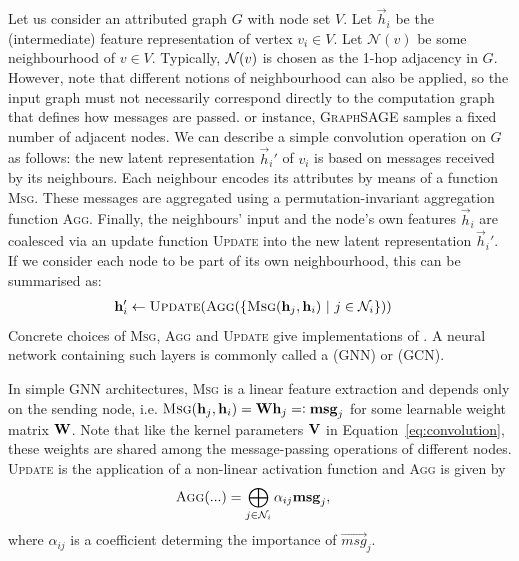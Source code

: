 \documentclass[
	fontsize=10pt, %
	twoside=false, %
	secnumdepth=1, %
  toc=indentunnumbered %
]{kaobook}
\begin{document}
Let us consider an attributed graph
$G$ with node set $V$.
Let $\vec h_i$ be the (intermediate) feature representation of vertex $v_i \in
V$. Let $\mathcal{N}(v)$ be some neighbourhood of $v \in V$. Typically,
$\neighb(v)$ is chosen as the 1-hop adjacency in $G$. However, note that
different notions of neighbourhood can also be applied, so the input graph must
not necessarily correspond directly to the computation graph that defines how
messages are passed. or instance, \textsc{GraphSAGE}
\cite{hamilton_InductiveRepresentationLearning_2018} samples a fixed number of
adjacent nodes. We can describe a simple convolution operation on $G$ as
follows: the new latent representation $\vec h_i'$ of $v_i$ is based on messages
received by its neighbours. Each neighbour encodes its attributes by means of a
function \textsc{Msg}. These messages are aggregated using a
permutation-invariant aggregation function \textsc{Agg}.
Finally, the neighbours' input and the node's own features $\vec h_i$ are
coalesced via an update function \textsc{Update} into the new latent
representation $\vec h_i'$. If we consider each node to be part of its own
neighbourhood, this can be summarised as:
\begin{align}
  & \vec h_i' \gets \textsc{Update}(\textsc{Agg}(\{\textsc{Msg}(\vec h_j, \vec h_i) ~|~ j \in \mathcal{N}_i\}))
    \label{eq:gnn-framework}
\end{align}
Concrete choices of \textsc{Msg}, \textsc{Agg} and \textsc{Update} give
implementations of . A neural network containing
such layers is commonly called a  (GNN)
or  (GCN).

In simple GNN architectures, \textsc{Msg} is a linear feature extraction and depends
only on the sending node, i.e. $\textsc{Msg}(\vec h_j, \vec h_i) = 
\mat W \vec h_j =: \msg_j$ for some learnable weight matrix $\mat W$. Note that
like the kernel parameters $\mat V$ in Equation~\ref{eq:convolution}, these weights are
shared among the message-passing operations of different nodes.
% 
\textsc{Update} is the application of a non-linear activation function and
\textsc{Agg} is given by
\begin{align*}
  & \textsc{Agg}(...) = \bigoplus_{j \in \mathcal{N}_i} \alpha_{ij} \vec{msg}_j,
\end{align*} where $\alpha_{ij}$ is a coefficient determing the importance of
$\vec{msg}_{j}$.
\end{document}

